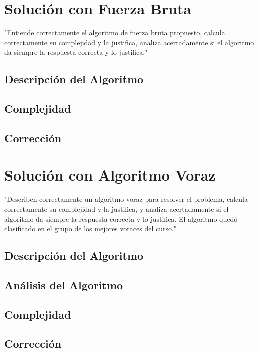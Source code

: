 \documentclass[letterpaper,10pt]{article}
\begin{document}
\section{Solución con Fuerza Bruta}
\label{sec:fuerza_bruta}
"Entiende correctamente el algoritmo de fuerza bruta propuesto, calcula correctamente su complejidad y la justifica, analiza acertadamente si el algoritmo da siempre la respuesta correcta y lo justifica."
\subsection{Descripción del Algoritmo}
\label{subsec:descripcion_fuerza_bruta}
\subsection{Complejidad}
\label{subsec:complejidad_fuerza_bruta}
\subsection{Corrección}
\label{subsec:correccion_fuerza_bruta}

\section{Solución con Algoritmo Voraz}
\label{sec:algoritmo_voraz}
"Describen correctamente un algoritmo voraz para resolver el problema, calcula correctamente su complejidad y la justifica, y analiza acertadamente si el algoritmo da siempre la respuesta correcta y lo justifica. El algoritmo quedó clasificado en el grupo de los mejores voraces del curso."
\subsection{Descripción del Algoritmo}
\label{subsec:descripcion_algoritmo_voraz}
\subsection{Análisis del Algoritmo}
\label{subsec:analisis_algoritmo_voraz}
\subsection{Complejidad}
\label{subsec:complejidad_algoritmo_voraz}
\subsection{Corrección}
\label{subsec:correccion_algoritmo_voraz}
\end{document}
